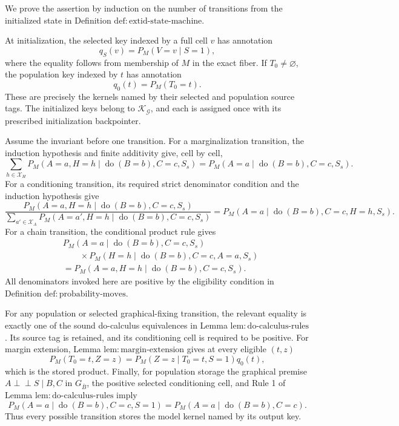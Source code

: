 We prove the assertion by induction on the number of transitions from the initialized state in Definition \(\mathrm{def{:}extid\text{-}state\text{-}machine}\).

At initialization, the selected key indexed by a full cell \(v\) has annotation
\[
 q_S(v)=P_M(V=v\mid S=1),
\]
where the equality follows from membership of \(M\) in the exact fiber.  If \(T_0\neq\varnothing\), the population key indexed by \(t\) has annotation
\[
 q_0(t)=P_M(T_0=t).
\]
These are precisely the kernels named by their selected and population source tags.  The initialized keys belong to \(\mathscr K_{\mathcal G}\), and each is assigned once with its prescribed initialization backpointer.

Assume the invariant before one transition.  For a marginalization transition, the induction hypothesis and finite additivity give, cell by cell,
\[
 \sum_{h\in\mathcal X_H}
 P_M(A=a,H=h\mid\operatorname{do}(B=b),C=c,S_s)
 =P_M(A=a\mid\operatorname{do}(B=b),C=c,S_s).
\]
For a conditioning transition, its required strict denominator condition and the induction hypothesis give
\[
 \frac{P_M(A=a,H=h\mid\operatorname{do}(B=b),C=c,S_s)}
 {\sum_{a'\in\mathcal X_A}P_M(A=a',H=h\mid\operatorname{do}(B=b),C=c,S_s)}
 =P_M(A=a\mid\operatorname{do}(B=b),C=c,H=h,S_s).
\]
For a chain transition, the conditional product rule gives
\[
 \begin{aligned}
 &P_M(A=a\mid\operatorname{do}(B=b),C=c,S_s)\\
 &\qquad{}\times
 P_M(H=h\mid\operatorname{do}(B=b),C=c,A=a,S_s)\\
 &=P_M(A=a,H=h\mid\operatorname{do}(B=b),C=c,S_s).
 \end{aligned}
\]
All denominators invoked here are positive by the eligibility condition in Definition \(\mathrm{def{:}probability\text{-}moves}\).

For any population or selected graphical-fixing transition, the relevant equality is exactly one of the sound do-calculus equivalences in Lemma \(\mathrm{lem{:}do\text{-}calculus\text{-}rules}\).  Its source tag is retained, and its conditioning cell is required to be positive.  For margin extension, Lemma \(\mathrm{lem{:}margin\text{-}extension}\) gives at every eligible \((t,z)\)
\[
 P_M(T_0=t,Z=z)
 =P_M(Z=z\mid T_0=t,S=1)q_0(t),
\]
which is the stored product.  Finally, for population storage the graphical premise \(A\perp\!\!\!\perp S\mid B,C\) in \(G_{\overline B}\), the positive selected conditioning cell, and Rule 1 of Lemma \(\mathrm{lem{:}do\text{-}calculus\text{-}rules}\) imply
\[
 P_M(A=a\mid\operatorname{do}(B=b),C=c,S=1)
 =P_M(A=a\mid\operatorname{do}(B=b),C=c).
\]
Thus every possible transition stores the model kernel named by its output key.

